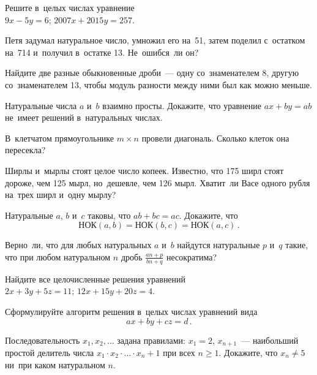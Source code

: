 \begin{problems}

\item
Решите в~целых числах уравнение
\\
\sp $9 x - 5 y = 6$;
\quad
\sp $2007 x + 2015 y = 257$.

\item
Петя задумал натуральное число, умножил его на~51, затем поделил с~остатком
на~714 и~получил в~остатке 13.
Не~ошибся~ли он?

\item
Найдите две разные обыкновенные дроби~--- одну со~знаменателем 8, другую
со~знаменателем 13, чтобы модуль разности между ними был как можно меньше.

\item
Натуральные числа $a$ и~$b$ взаимно просты.
Докажите, что уравнение $a x + b y = a b$ не~имеет решений в~натуральных
числах.

\item
В~клетчатом прямоугольнике $m \times n$ провели диагональ.
Сколько клеток она пересекла?

\item
Ширлы и~мырлы стоят целое число копеек.
Известно, что 175 ширл стоят дороже, чем 125 мырл, но~дешевле, чем 126 мырл.
Хватит~ли Васе одного рубля на~трех ширл и~одну мырлу?

\item
Натуральные $a$, $b$ и~$c$ таковы, что $a b + b c = a c$.
Докажите, что
\[
    \text{НОК}(a, b) = \text{НОК}(b, c) = \text{НОК}(a, c)
\,.\]

\item
Верно~ли, что для любых натуральных $a$ и~$b$ найдутся натуральные $p$ и~$q$
такие, что при любом натуральном $n$ дробь $\frac{a n + p}{b n + q}$
несократима?

\item
Найдите все целочисленные решения уравнений
\\
\sp
$2 x + 3 y + 5 z = 11$;
\quad
\sp
$12 x + 15 y + 20 z = 4$.

\item
Сформулируйте алгоритм решения в~целых числах уравнений вида
\[
    a x + b y + c z = d
\,.\]

\item
Последовательность $x_1, x_2, \ldots$ задана правилами:
$x_1 = 2$, $x_{n+1}$~--- наибольший простой делитель числа
$x_1 \cdot x_2 \cdot \ldots \cdot x_n + 1$ при всех $n \geq 1$.
Докажите, что $x_n \neq 5$ ни~при каком натуральном $n$. 


\end{problems}

